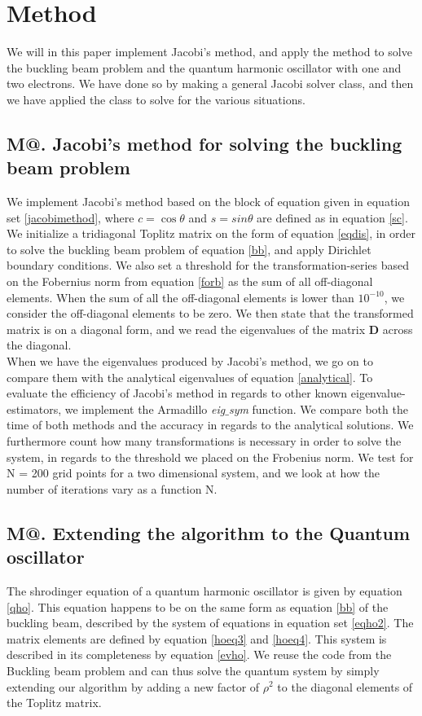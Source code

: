\documentclass[%
reprint,
amsmath,amssymb,
aps,
]{revtex4-1}
\makeatletter
\newcommand*{\rom}[1]{\expandafter\@slowromancap\romannumeral #1@}
\makeatother
\begin{document}
\section*{Method} \noindent 
We will in this paper implement Jacobi's method, and apply the method to solve the buckling beam problem and the quantum harmonic oscillator with one and two electrons. We have done so by making a general Jacobi solver class, and then we have applied the class to solve for the various situations. 
\subsection*{M\rom{1}. Jacobi's method for solving the buckling beam problem}
\noindent We implement Jacobi's method based on the block of equation given in equation set \ref{jacobimethod}, where $c = \cos{\theta}$ and $s = sin{\theta}$ are defined as in equation \ref{sc}. We initialize a tridiagonal Toplitz matrix on the form of equation \ref{eqdis}, in order to solve the buckling beam problem of equation \ref{bb}, and apply Dirichlet boundary conditions. We also set a threshold for the transformation-series based on the Fobernius norm from equation \ref{forb} as the sum of all off-diagonal elements. When the sum of all the off-diagonal elements is lower than $10^{-10}$, we consider the off-diagonal elements to be zero. We then state that the transformed matrix is on a diagonal form, and we read the eigenvalues of the matrix $\mathbf{D}$ across the diagonal. \\ \indent 
When we have the eigenvalues produced by Jacobi's method, we go on to compare them with the analytical eigenvalues of equation \ref{analytical}. To evaluate the efficiency of Jacobi's method in regards to other known eigenvalue-estimators, we implement the Armadillo \textit{eig$\_$sym} function. We compare both the time of both methods and the accuracy in regards to the analytical solutions. We furthermore count how many transformations is necessary in order to solve the system, in regards to the threshold we placed on the Frobenius norm. We test for N = 200 grid points for a two dimensional system, and we look at how  the number of iterations vary as a function N. 
\subsection*{M\rom{2}. Extending the algorithm to the Quantum oscillator} \noindent
The shrodinger equation of a quantum harmonic oscillator is given by  equation \ref{qho}. This equation happens to be on the same form as equation \ref{bb} of the buckling beam, described by the system of equations in equation set \ref{eqho2}. The matrix elements are defined by equation \ref{hoeq3} and \ref{hoeq4}. This system is described in its completeness by equation \ref{evho}. We reuse the code from the Buckling beam problem and can thus solve the quantum system by simply extending our algorithm by adding a new factor of $\rho^2$ to the diagonal elements of the Toplitz matrix. 
\end{document}
